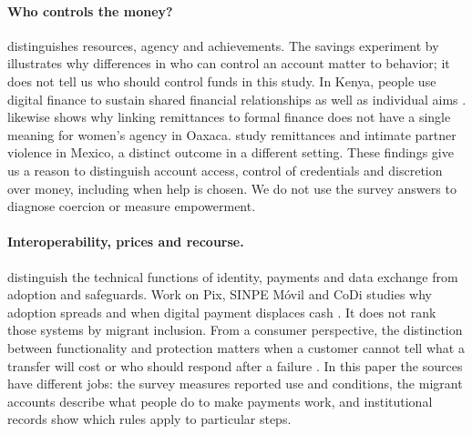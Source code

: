 \paragraph{Who controls the money?}
\citet{kabeer1999} distinguishes resources, agency and achievements. The savings experiment by \citet{ashraf2015} illustrates why differences in who can control an account matter to behavior; it does not tell us who should control funds in this study. In Kenya, people use digital finance to sustain shared financial relationships as well as individual aims \citep{kusimba_it_2018}. \citet{smyth_challenging_2022} likewise shows why linking remittances to formal finance does not have a single meaning for women's agency in Oaxaca. \citet{silveriomurillo_remittances_2022} study remittances and intimate partner violence in Mexico, a distinct outcome in a different setting. These findings give us a reason to distinguish account access, control of credentials and discretion over money, including when help is chosen. We do not use the survey answers to diagnose coercion or measure empowerment.

\paragraph{Interoperability, prices and recourse.}
\citet{eaves_rao_verified_2025} distinguish the technical functions of identity, payments and data exchange from adoption and safeguards. Work on Pix, SINPE Móvil and CoDi studies why adoption spreads and when digital payment displaces cash \citep{argente_drivers_2025}. It does not rank those systems by migrant inclusion. From a consumer perspective, the distinction between functionality and protection matters when a customer cannot tell what a transfer will cost or who should respond after a failure \citep{draper_verified_2024}. In this paper the sources have different jobs: the survey measures reported use and conditions, the migrant accounts describe what people do to make payments work, and institutional records show which rules apply to particular steps.
